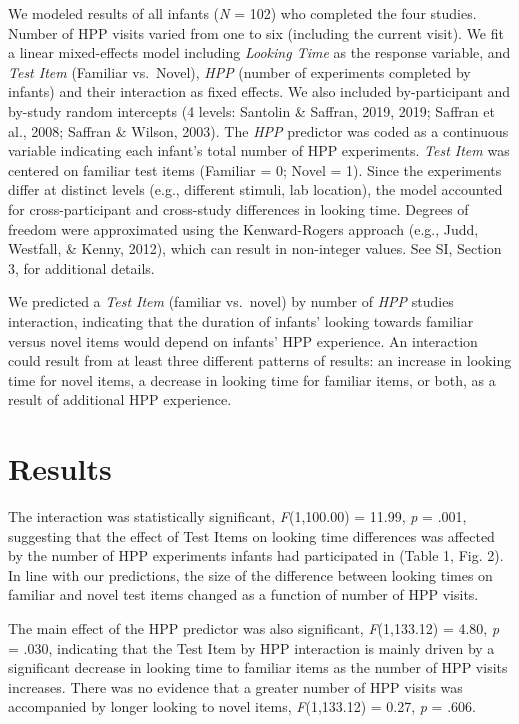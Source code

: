 \documentclass[english,man,man,floatsintext]{apa6}
\begin{document}
We modeled results of all infants (\emph{N} = 102) who completed the four studies. Number of HPP visits varied from one to six (including the current visit). We fit a linear mixed-effects model including \emph{Looking Time} as the response variable, and \emph{Test Item} (Familiar vs.~Novel), \emph{HPP} (number of experiments completed by infants) and their interaction as fixed effects. We also included by-participant and by-study random intercepts (4 levels: Santolin \& Saffran, 2019, 2019; Saffran et al., 2008; Saffran \& Wilson, 2003). The \emph{HPP} predictor was coded as a continuous variable indicating each infant's total number of HPP experiments. \emph{Test Item} was centered on familiar test items (Familiar = 0; Novel = 1). Since the experiments differ at distinct levels (e.g., different stimuli, lab location), the model accounted for cross-participant and cross-study differences in looking time. Degrees of freedom were approximated using the Kenward-Rogers approach (e.g., Judd, Westfall, \& Kenny, 2012), which can result in non-integer values. See SI, Section 3, for additional details.

We predicted a \emph{Test Item} (familiar vs.~novel) by number of \emph{HPP} studies interaction, indicating that the duration of infants' looking towards familiar versus novel items would depend on infants' HPP experience. An interaction could result from at least three different patterns of results: an increase in looking time for novel items, a decrease in looking time for familiar items, or both, as a result of additional HPP experience.

\hypertarget{results}{%
\section{Results}\label{results}}

The interaction was statistically significant, \emph{F}(1,100.00) = 11.99, \emph{p} = .001, suggesting that the effect of Test Items on looking time differences was affected by the number of HPP experiments infants had participated in (Table 1, Fig. 2). In line with our predictions, the size of the difference between looking times on familiar and novel test items changed as a function of number of HPP visits.

The main effect of the HPP predictor was also significant, \emph{F}(1,133.12) = 4.80, \emph{p} = .030, indicating that the Test Item by HPP interaction is mainly driven by a significant decrease in looking time to familiar items as the number of HPP visits increases. There was no evidence that a greater number of HPP visits was accompanied by longer looking to novel items, \emph{F}(1,133.12) = 0.27, \emph{p} = .606.
\end{document}

